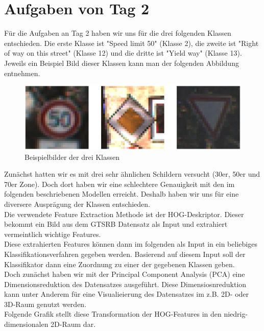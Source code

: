 \chapter{Aufgaben von Tag 2}

Für die Aufgaben an Tag 2 haben wir uns für die drei folgenden Klassen entschieden.
Die erste Klasse ist "Speed limit 50" (Klasse 2), die zweite ist "Right of way on this street" (Klasse 12) und die dritte ist "Yield way" (Klasse 13). Jeweils ein Beispiel Bild dieser Klassen kann man der folgenden Abbildung entnehmen.

\begin{figure}[h]
\centering
\includegraphics[scale=0.6]{./bilder/3_classes_imshow.png}
\caption{Beispielbilder der drei Klassen}
\end{figure}

Zunächst hatten wir es mit drei sehr ähnlichen Schildern versucht (30er, 50er und 70er Zone). Doch dort haben wir eine schlechtere Genauigkeit mit den im folgenden beschriebenen Modellen erreicht. Deshalb haben wir uns für eine diversere Ausprägung der Klassen entschieden.\\
Die verwendete Feature Extraction Methode ist der HOG-Deskriptor. Dieser bekommt ein Bild aus dem GTSRB Datensatz als Input und extrahiert vermeintlich wichtige Features.\\
Diese extrahierten Features können dann im folgenden als Input in ein beliebiges Klassifikationsverfahren gegeben werden. Basierend auf diesem Input soll der Klassifikator dann eine Zuordnung zu einer der gegebenen Klassen geben.\\
Doch zunächst haben wir mit der Principal Component Analysis (PCA) eine Dimensionsreduktion des Datensatzes ausgeführt. Diese Dimensiosnreduktion kann unter Anderem für eine Visualieierung des Datensatzes im z.B. 2D- oder 3D-Raum genutzt werden.\\
Folgende Grafik stellt diese Transformation der HOG-Features in den niedrig-dimensionalen 2D-Raum dar.

